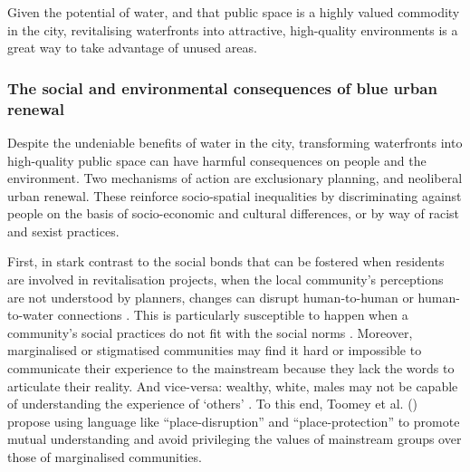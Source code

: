 \documentclass{article}
\begin{document}
Given the potential of water, and that public space is a highly valued commodity in the city, revitalising waterfronts into attractive, high-quality environments is a great way to take advantage of unused areas.
 
\subsubsection{The social and environmental consequences of blue urban renewal}

Despite the undeniable benefits of water in the city, transforming waterfronts into high-quality public space can have harmful consequences on people and the environment.
Two mechanisms of action are exclusionary planning, and neoliberal urban renewal. These reinforce socio-spatial inequalities by discriminating against people on the basis of socio-economic and cultural differences, or by way of racist and sexist practices.

First, in stark contrast to the social bonds that can be fostered when residents are involved in revitalisation projects, when the local community’s perceptions are not understood by planners, changes can disrupt human-to-human or human-to-water connections \parencite{toomey2021place}. This is particularly susceptible to happen when a community's social practices do not fit with the social norms \parencite{wessells2014urban}. 
Moreover, marginalised or stigmatised communities may find it hard or impossible to communicate their experience to the mainstream because they lack the words to articulate their reality. And vice-versa: wealthy, white, males may not be capable of understanding the experience of `others' \parencite{anguelovski2020expanding}. To this end, Toomey et al. (\citeyear{toomey2021place}) propose using language like ``place-disruption'' and ``place-protection'' to promote mutual understanding and avoid privileging the values of mainstream groups over those of marginalised communities.
\end{document}
